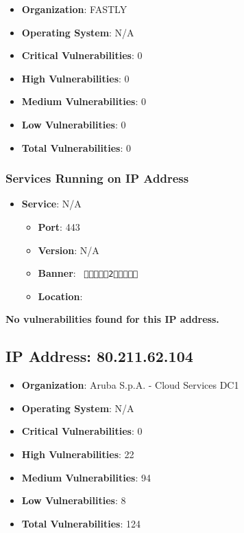 \documentclass{article}
\begin{document}
\begin{itemize}
    \item \textbf{Organization}: FASTLY
    \item \textbf{Operating System}:  N/A 
    \item \textbf{Critical Vulnerabilities}: 0
    \item \textbf{High Vulnerabilities}: 0
    \item \textbf{Medium Vulnerabilities}: 0
    \item \textbf{Low Vulnerabilities}: 0
    \item \textbf{Total Vulnerabilities}: 0
\end{itemize}

\subsubsection*{Services Running on IP Address}

\begin{itemize}
    
        \item \textbf{Service}: N/A
        \begin{itemize}
            \item \textbf{Port}: 443
            \item \textbf{Version}:  N/A 
            \item \textbf{Banner}: \texttt{
                 2  
            }
            \item \textbf{Location}: \href{  }{  }
        \end{itemize}
    
\end{itemize}


\textbf{No vulnerabilities found for this IP address.}




\clearpage



\subsection*{IP Address: 80.211.62.104}

\begin{itemize}
    \item \textbf{Organization}: Aruba S.p.A. - Cloud Services DC1
    \item \textbf{Operating System}:  N/A 
    \item \textbf{Critical Vulnerabilities}: 0
    \item \textbf{High Vulnerabilities}: 22
    \item \textbf{Medium Vulnerabilities}: 94
    \item \textbf{Low Vulnerabilities}: 8
    \item \textbf{Total Vulnerabilities}: 124
\end{itemize}
\end{document}
